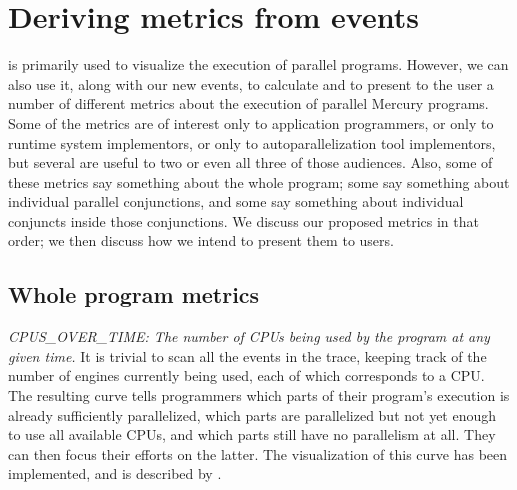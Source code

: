 \section{Deriving metrics from events}
\label{sec:analysis}

\tscope is primarily used to visualize the execution of parallel programs.
However, we can also use it, along with our new events,
to calculate and to present to the user
a number of different metrics about the execution of parallel Mercury programs.
Some of the metrics are of interest
only to application programmers,
or only to runtime system implementors,
or only to autoparallelization tool implementors,
but several are useful to two or even all three of those audiences.
Also, some of these metrics say something about the whole program;
some say something about individual parallel conjunctions,
and some say something about individual conjuncts inside those conjunctions.
We discuss our proposed metrics in that order;
we then discuss how we intend to present them to users.

% 

\subsection{Whole program metrics}



\emph{CPUS\_OVER\_TIME:
The number of CPUs being used by the program at any given time.}
It is trivial to scan all the events in the trace,
keeping track of the number of engines currently being used,
each of which corresponds to a CPU.
The resulting curve tells programmers
which parts of their program's execution is already sufficiently parallelized,
which parts are parallelized but not yet enough to use all available CPUs,
and which parts still have no parallelism at all.
They can then focus their efforts on the latter.
The visualization of this curve has been implemented,
and is described by \cite{threadscope}.

